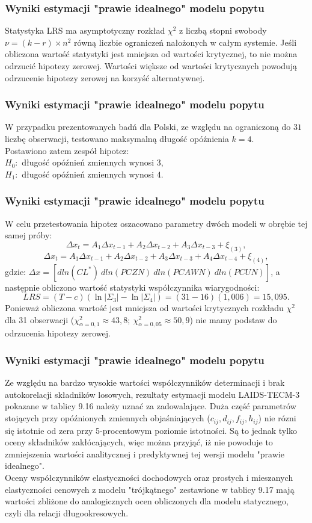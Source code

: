 \documentclass[11pt,usenames,dvipsnames,svgnames,x11names]{beamer}\usepackage[]{graphicx}\usepackage[]{color}
\theoremstyle{definition}
\theoremstyle{remark}
\begin{document}
\begin{frame}
\frametitle{Wyniki estymacji "prawie idealnego" modelu popytu }
Statystyka LRS ma asymptotyczny rozkład $ \chi ^2 $ z liczbą stopni swobody $ \nu=(k-r) \times n^2 $ równą liczbie ograniczeń nałożonych w całym systemie. Jeśli obliczona wartość statystyki jest mniejsza od wartości krytycznej, to nie można odrzucić hipotezy zerowej. Wartości większe od wartości krytycznych powodują odrzucenie hipotezy zerowej na korzyść alternatywnej.
\end{frame}

\begin{frame}
\frametitle{Wyniki estymacji "prawie idealnego" modelu popytu }
W przypadku prezentowanych badń dla Polski, ze względu na ograniczoną do $31$ liczbę obserwacji, testowano maksymalną długość opóźnienia $k=4$.
\\
Postawiono zatem zespół hipotez: \\
 $H_0:$ długość opóźnień zmiennych wynosi $3$,    \\
 $H_1:$ długość opóźnień zmiennych wynosi $4$.   
\end{frame}

\begin{frame}
\frametitle{Wyniki estymacji "prawie idealnego" modelu popytu }
W celu przetestowania hipotez oszacowano parametry dwóch modeli w obrębie tej samej próby:
$$\Delta x_t=A_1 \Delta x_{t-1} + A_2 \Delta x_{t-2}+A_3 \Delta x_{t-3} +\xi_{(3)},$$
$$\Delta x_t=A_1 \Delta x_{t-1} + A_2 \Delta x_{t-2}+A_3 \Delta x_{t-3}+A_4 \Delta x_{t-4} +\xi_{(4)},$$
gdzie: $\Delta x=[dln(CL^*) \ dln(PCZN) \ dln(PCAWN) \ dln(PCUN)]$, a następnie obliczono wartość statystyki współczynnika wiarygodności:
$$LRS=(T-c)(\ln|\Sigma_3|-\ln|\Sigma_4|)=(31-16)(1,006)=15,095.$$
Ponieważ obliczona wartość jest mniejsza od wartości krytycznych rozkładu $\chi^2$ dla 31 obserwacji 
($\chi^2_{\alpha=0,1} \approx 43,8; \ \chi^2_{\alpha=0,05} \approx 50,9 $) nie mamy podstaw do odrzucenia hipotezy zerowej.
\end{frame}
 
\begin{frame}

\frametitle{Wyniki estymacji "prawie idealnego" modelu popytu}

Ze względu na bardzo wysokie wartości współczynników determinacji i brak autokorelacji składników losowych, rezultaty estymacji modelu LAIDS-TECM-3 pokazane w tablicy 9.16 należy uznać za zadowalające. Duża część parametrów stojących przy opóźnionych zmiennych objaśniających ($c_{ij},d_{ij},f_{ij},h_{ij}$) nie rózni się istotnie od zera przy 5-procentowym poziomie istotności. Są to jednak tylko oceny składników zakłócających, więc można przyjąć, iż nie powoduje to zmniejszenia wartości analitycznej i predyktywnej tej wersji modelu "prawie idealnego".  \\

Oceny współczynników elastyczności dochodowych oraz prostych i mieszanych elastyczności cenowych z modelu "trójkątnego" zestawione w tablicy 9.17 mają wartości zbliżone do analogicznych ocen obliczonych dla modelu statycznego, czyli dla relacji długookresowych.
\end{frame}
 
\end{document}
